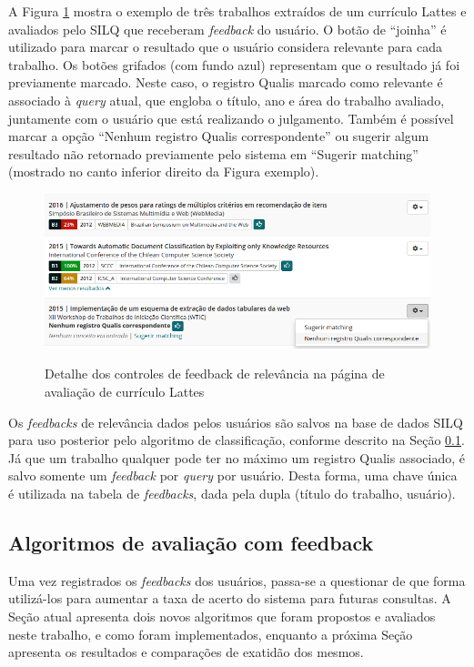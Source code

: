 \documentclass[12pt]{article}
\newcommand{\quotes}[1]{``#1''}
\begin{document}
A Figura \ref{fig:feedbacks} mostra o exemplo de três trabalhos extraídos de um currículo Lattes e avaliados pelo SILQ que receberam \textit{feedback} do usuário. O botão de \quotes{joinha} é utilizado para marcar o resultado que o usuário considera relevante para cada trabalho. Os botões grifados (com fundo azul) representam que o resultado já foi previamente marcado. Neste caso, o registro Qualis marcado como relevante é associado à \textit{query} atual, que engloba o título, ano e área do trabalho avaliado, juntamente com o usuário que está realizando o julgamento. Também é possível marcar a opção \quotes{Nenhum registro Qualis correspondente} ou sugerir algum resultado não retornado previamente pelo sistema em \quotes{Sugerir matching} (mostrado no canto inferior direito da Figura exemplo).

\begin{figure}[!h]
   \centering
   \caption{Detalhe dos controles de feedback de relevância na página de avaliação de currículo Lattes}
   \includegraphics[width=\textwidth]{../figuras/feedbacks.png}
   \label{fig:feedbacks}
\end{figure}

Os \textit{feedbacks} de relevância dados pelos usuários são salvos na base de dados SILQ para uso posterior pelo algoritmo de classificação, conforme descrito na Seção \ref{sec:algoritmo}. Já que um trabalho qualquer pode ter no máximo um registro Qualis associado, é salvo somente um \textit{feedback} por \textit{query} por usuário. Desta forma, uma chave única é utilizada na tabela de \textit{feedbacks}, dada pela dupla (título do trabalho, usuário).

\subsection{Algoritmos de avaliação com feedback} \label{sec:algoritmo}

Uma vez registrados os \textit{feedbacks} dos usuários, passa-se a questionar de que forma utilizá-los para aumentar a taxa de acerto do sistema para futuras consultas. A Seção atual apresenta dois novos algoritmos que foram propostos e avaliados neste trabalho, e como foram implementados, enquanto a próxima Seção apresenta os resultados e comparações de exatidão dos mesmos.
\end{document}
